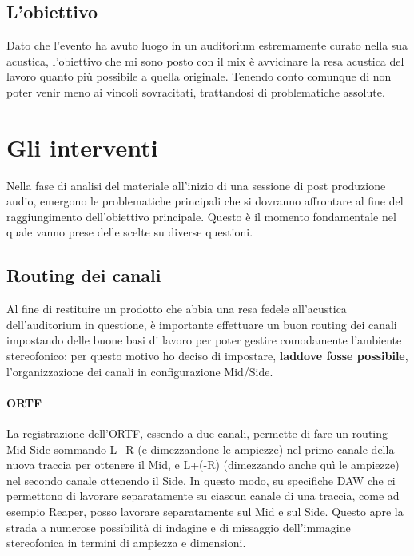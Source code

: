 
\newpage
	
	\subsection{L'obiettivo}
	Dato che l'evento ha avuto luogo in un auditorium estremamente curato nella sua acustica, l'obiettivo che mi sono posto con il mix è avvicinare la resa acustica del lavoro quanto più possibile a quella originale. Tenendo conto comunque di non poter venir meno ai vincoli sovracitati, trattandosi di problematiche assolute.
	
\section{Gli interventi}
Nella fase di analisi del materiale all'inizio di una sessione di post produzione audio, emergono le problematiche principali che si dovranno affrontare al fine del raggiungimento dell'obiettivo principale. Questo è il momento fondamentale nel quale vanno prese delle scelte su diverse questioni.

	\subsection{Routing dei canali}
	Al fine di restituire un prodotto che abbia una resa fedele all'acustica dell'auditorium in questione, è importante effettuare un buon routing dei canali impostando delle buone basi di lavoro per poter gestire comodamente l'ambiente stereofonico: per questo motivo ho deciso di impostare, \textbf{laddove fosse possibile}, l'organizzazione dei canali in configurazione Mid/Side.
	
		\paragraph{ORTF} La registrazione dell'ORTF, essendo a due canali, permette di fare un routing Mid Side sommando L+R (e dimezzandone le ampiezze) nel primo canale della nuova traccia per ottenere il Mid, e L+(-R) (dimezzando anche quì le ampiezze) nel secondo canale ottenendo il Side.
		In questo modo, su specifiche DAW che ci permettono di lavorare separatamente su ciascun canale di una traccia, come ad esempio Reaper, posso lavorare separatamente sul Mid e sul Side. Questo apre la strada a numerose possibilità di indagine e di missaggio dell'immagine stereofonica in termini di ampiezza e dimensioni.
		
